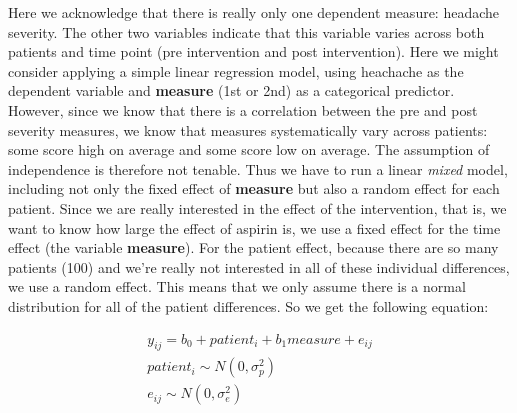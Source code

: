 \documentclass[]{book}\usepackage[]{graphicx}\usepackage[]{color}
\begin{document}
Here we acknowledge that there is really only one dependent measure: headache severity. The other two variables indicate that this variable varies across both patients and time point (pre intervention and post intervention). Here we might consider applying a simple linear regression model, using heachache as the dependent variable and \textbf{measure} (1st or 2nd) as a categorical predictor. However, since we know that there is a correlation between the pre and post severity measures, we know that measures systematically vary across patients: some score high on average and some score low on average. The assumption of independence is therefore not tenable. Thus we have to run a linear \textit{mixed} model, including not only the fixed effect of \textbf{measure} but also a random effect for each patient. Since we are really interested in the effect of the intervention, that is, we want to know how large the effect of aspirin is, we use a fixed effect for the time effect (the variable \textbf{measure}). For the patient effect, because there are so many patients (100) and we're really not interested in all of these individual differences, we use a random effect. This means that we only assume there is a normal distribution for all of the patient differences. So we get the following equation:


\begin{eqnarray}
y_{ij} = b_0 + patient_i + b_1 measure + e_{ij} \\
patient_i \sim N(0, \sigma_p^2)\\
e_{ij} \sim N(0, \sigma_e^2)
\end{eqnarray}
\end{document}
